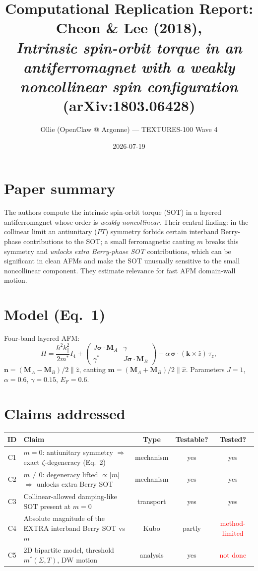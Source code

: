 \documentclass[11pt]{article}
\title{Computational Replication Report:\\ Cheon \& Lee (2018),\\ \emph{Intrinsic spin-orbit torque in an antiferromagnet with a weakly noncollinear spin configuration} (arXiv:1803.06428)}
\author{Ollie (OpenClaw @ Argonne) --- TEXTURES-100 Wave 4}
\date{2026-07-19}
\begin{document}
\maketitle

\section{Paper summary}
The authors compute the intrinsic spin-orbit torque (SOT) in a layered antiferromagnet whose
order is \emph{weakly noncollinear}. Their central finding: in the collinear limit an antiunitary
($PT$) symmetry forbids certain interband Berry-phase contributions to the SOT; a small
ferromagnetic canting $m$ breaks this symmetry and \emph{unlocks extra Berry-phase SOT}
contributions, which can be significant in clean AFMs and make the SOT unusually sensitive to the
small noncollinear component. They estimate relevance for fast AFM domain-wall motion.

\section{Model (Eq.~1)}
Four-band layered AFM:
\[
H=\frac{\hbar^2 k_\parallel^2}{2m^*}I_4
+\begin{pmatrix}J\boldsymbol\sigma\!\cdot\!\mathbf M_A & \gamma\\ \gamma^* & J\boldsymbol\sigma\!\cdot\!\mathbf M_B\end{pmatrix}
+\alpha\,\boldsymbol\sigma\!\cdot\!(\mathbf k\times\hat z)\,\tau_z,
\]
$\mathbf n=(\mathbf M_A-\mathbf M_B)/2\parallel\hat z$, canting $\mathbf m=(\mathbf M_A+\mathbf M_B)/2\parallel\hat x$.
Parameters $J{=}1$, $\alpha{=}0.6$, $\gamma{=}0.15$, $E_F{=}0.6$.

\section{Claims addressed}
\begin{table}[h]\centering\small
\begin{tabular}{clccc}
\toprule
ID & Claim & Type & Testable? & Tested? \\
\midrule
C1 & $m{=}0$: antiunitary symmetry $\Rightarrow$ exact $\zeta$-degeneracy (Eq.~2) & mechanism & yes & yes \\
C2 & $m{\neq}0$: degeneracy lifted $\propto|m|$ $\Rightarrow$ unlocks extra Berry SOT & mechanism & yes & yes \\
C3 & Collinear-allowed damping-like SOT present at $m{=}0$ & transport & yes & yes \\
C4 & Absolute magnitude of the EXTRA interband Berry SOT vs $m$ & Kubo & partly & \textcolor{red}{method-limited} \\
C5 & 2D bipartite model, threshold $m^*(\Sigma,T)$, DW motion & analysis & yes & \textcolor{red}{not done} \\
\bottomrule
\end{tabular}
\end{table}
\end{document}
